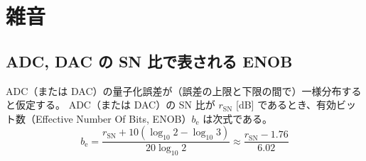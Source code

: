 \part{雑音}
    \newcommand{\rSN}{r_\text{SN}}
    \newcommand{\bEff}{b_\text{e}}
    \newcommand{\Afl}{A_\text{full}}
    \newcommand{\An}{A_\text{n}}
    \newcommand{\Psig}{P_\text{sig}}
    \newcommand{\Pn}{P_\text{n}}
    \chapter{ADC, DAC の SN 比で表される ENOB}
        \begin{shadebox}
            ADC（または DAC）の量子化誤差が（誤差の上限と下限の間で）一様分布すると仮定する。
            ADC（または DAC）の SN 比が $\rSN$ [dB] であるとき、有効ビット数（Effective Number Of Bits, ENOB）$\bEff$ は次式である。
            \[ \bEff = \frac{\rSN + 10(\log_{10} 2 - \log_{10} 3)}{20\log_{10} 2} \approx \frac{\rSN - 1.76}{6.02} \]
        \end{shadebox}
